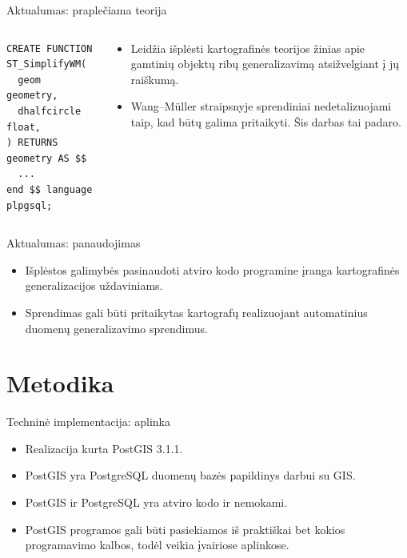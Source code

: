 \documentclass[14pt]{beamer}
\newcommand{\WM}{Wang--M{\"u}ller}
\begin{document}
\begin{frame}[fragile]{Aktualumas: praplečiama teorija}
  \begin{columns}[c]
    \begin{column}{.3\textwidth}
      \begin{verbatim}
CREATE FUNCTION ST_SimplifyWM(
  geom geometry,
  dhalfcircle float,
) RETURNS geometry AS $$
  ...
end $$ language plpgsql;
      \end{verbatim}
    \end{column}
    \begin{column}{.7\textwidth}
      \begin{itemize}
        \item Leidžia išplėsti kartografinės teorijos žinias apie gamtinių
          objektų ribų generalizavimą atsižvelgiant į jų raiškumą.
        \item {\WM} straipsnyje sprendiniai nedetalizuojami taip, kad būtų
          galima pritaikyti. Šis darbas tai padaro.
      \end{itemize}
    \end{column}
  \end{columns}
\end{frame}

\begin{frame}{Aktualumas: panaudojimas}
    \begin{itemize}
        \item Išplėstos galimybės pasinaudoti atviro
            kodo programine įranga kartografinės generalizacijos
            uždaviniams.
        \item Sprendimas gali būti pritaikytas kartografų realizuojant
            automatinius duomenų generalizavimo sprendimus.
    \end{itemize}
\end{frame}


\section{Metodika}

\begin{frame}{Techninė implementacija: aplinka}
    \begin{itemize}[<+->]
        \item Realizacija kurta PostGIS 3.1.1.

        \item PostGIS yra PostgreSQL duomenų bazės papildinys darbui su GIS.

        \item PostGIS ir PostgreSQL yra atviro kodo ir nemokami.
            
        \item PostGIS programos gali būti pasiekiamos iš praktiškai bet kokios
            programavimo kalbos, todėl veikia įvairiose aplinkose.

    \end{itemize}
\end{frame}
\end{document}
